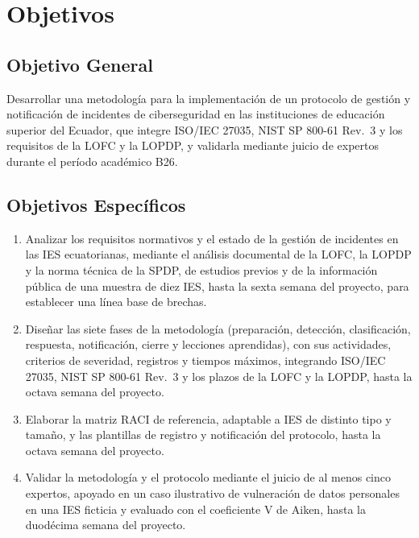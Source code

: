 \section{Objetivos}
\subsection{Objetivo General}
Desarrollar una metodología para la implementación de un protocolo de gestión y notificación de incidentes de ciberseguridad en las instituciones de educación superior del Ecuador, que integre ISO/IEC 27035, NIST SP 800-61 Rev.~3 y los requisitos de la LOFC y la LOPDP, y validarla mediante juicio de expertos durante el período académico B26.

\subsection{Objetivos Específicos}
\begin{enumerate}
  \item Analizar los requisitos normativos y el estado de la gestión de incidentes en las IES ecuatorianas, mediante el análisis documental de la LOFC, la LOPDP y la norma técnica de la SPDP, de estudios previos y de la información pública de una muestra de diez IES, hasta la sexta semana del proyecto, para establecer una línea base de brechas.
  \item Diseñar las siete fases de la metodología (preparación, detección, clasificación, respuesta, notificación, cierre y lecciones aprendidas), con sus actividades, criterios de severidad, registros y tiempos máximos, integrando ISO/IEC 27035, NIST SP 800-61 Rev.~3 y los plazos de la LOFC y la LOPDP, hasta la octava semana del proyecto.
  \item Elaborar la matriz RACI de referencia, adaptable a IES de distinto tipo y tamaño, y las plantillas de registro y notificación del protocolo, hasta la octava semana del proyecto.
  \item Validar la metodología y el protocolo mediante el juicio de al menos cinco expertos, apoyado en un caso ilustrativo de vulneración de datos personales en una IES ficticia y evaluado con el coeficiente V de Aiken, hasta la duodécima semana del proyecto.
\end{enumerate}

